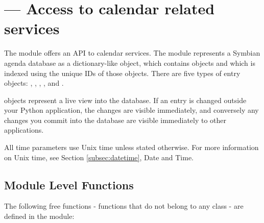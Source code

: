 %
%
%

\section{ ---
  Access to calendar related services}
\label{sec:calendareka2}


The  module offers an API to calendar services. The 
 module represents a Symbian agenda database as a 
dictionary-like  object, which contains 
objects and which is indexed using the unique IDs of those objects. There 
are five types of entry objects: , 
, , ,
 and . 

 objects represent a live view into the database. If an 
entry is changed outside your Python application, the changes are visible 
immediately, and conversely any changes you commit into the database are 
visible immediately to other applications. 

All time parameters use Unix time unless stated otherwise. For more 
information on Unix time, see Section \ref{subsec:datetime}, 
Date and Time.

\subsection{Module Level Functions}
\label{subsec:calendarmodule}
The following free functions - functions that do not belong to any class 
- are defined in the  module:

